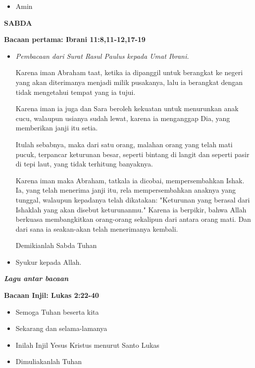 \documentclass[a5paper,12pt,openany]{scrbook}
\makeatletter
\newcommand{\judul}[1]{%
  {\parindent \z@ \centering \normalfont
    \interlinepenalty\@M \Large \bfseries #1\par\nobreak \vskip 20\p@ }}
\newcommand{\subjudul}[1]{%
  {\parindent \z@ \normalfont
    \interlinepenalty\@M \bfseries #1\par\nobreak \vskip 20\p@ }}
\newcommand{\lagu}[1]{%
  {\parindent \z@ \normalfont
    \interlinepenalty\@M \bfseries \emph{#1}\par\nobreak \vskip 20\p@ }}
\newcommand{\BU}[1]{\begin{itemize} \item[U:] #1 \end{itemize}}
\newcommand{\BI}[1]{\begin{itemize} \item[P:] #1 \end{itemize}}
\newcommand{\BP}[1]{\begin{itemize} \item[P:] #1 \end{itemize}}
\makeatother
\begin{document}
\BU{Amin}

\judul{SABDA}

\subjudul{Bacaan pertama: Ibrani 11:8,11-12,17-19}

\BP{\emph{Pembacaan dari Surat Rasul Paulus kepada Umat Ibrani.}

Karena iman Abraham taat, ketika ia dipanggil untuk berangkat ke negeri yang akan diterimanya menjadi milik pusakanya, lalu ia berangkat dengan tidak mengetahui tempat yang ia tujui.

Karena iman ia juga dan Sara beroleh kekuatan untuk menurunkan anak cucu, walaupun usianya sudah lewat, karena ia menganggap Dia, yang memberikan janji itu setia.

Itulah sebabnya, maka dari satu orang, malahan orang yang telah mati pucuk, terpancar keturunan besar, seperti bintang di langit dan seperti pasir di tepi laut, yang tidak terhitung banyaknya.

Karena iman maka Abraham, tatkala ia dicobai, mempersembahkan Ishak. Ia, yang telah menerima janji itu, rela mempersembahkan anaknya yang tunggal, walaupun kepadanya telah dikatakan: "Keturunan yang berasal dari Ishaklah yang akan disebut keturunanmu."
Karena ia berpikir, bahwa Allah berkuasa membangkitkan orang-orang sekalipun dari antara orang mati. Dan dari sana ia seakan-akan telah menerimanya kembali.

Demikianlah Sabda Tuhan
}

\BU{Syukur kepada Allah.}

\lagu{Lagu antar bacaan}


\subjudul{Bacaan Injil:  Lukas 2:22-40}

\BI{Semoga Tuhan beserta kita}

\BU{Sekarang dan selama-lamanya}

\BI{Inilah Injil Yesus Kristus menurut Santo Lukas}

\BU{Dimuliakanlah Tuhan}
\end{document}

